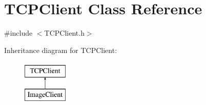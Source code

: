 \hypertarget{classTCPClient}{\section{T\-C\-P\-Client Class Reference}
\label{classTCPClient}
}


{\ttfamily \#include $<$T\-C\-P\-Client.\-h$>$}

Inheritance diagram for T\-C\-P\-Client\-:\begin{figure}[H]
\begin{center}
\leavevmode
\includegraphics[height=2.000000cm]{classTCPClient}
\end{center}
\end{figure}
